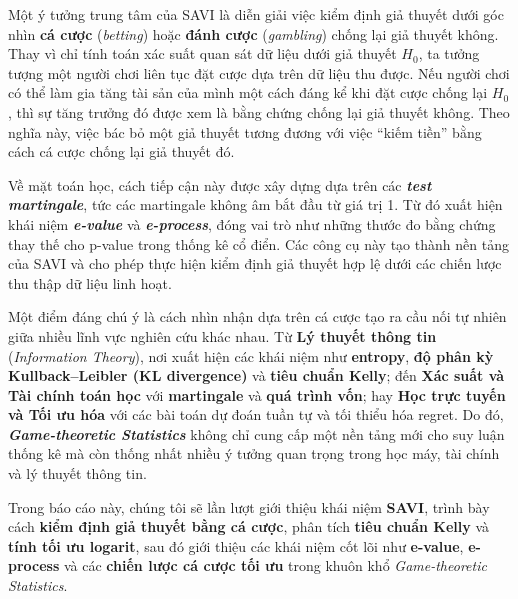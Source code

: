 Một ý tưởng trung tâm của SAVI là diễn giải việc kiểm định giả thuyết dưới góc nhìn \textbf{cá cược} (\textit{betting}) hoặc \textbf{đánh cược} (\textit{gambling}) chống lại giả thuyết không. Thay vì chỉ tính toán xác suất quan sát dữ liệu dưới giả thuyết $H_0$, ta tưởng tượng một người chơi liên tục đặt cược dựa trên dữ liệu thu được. Nếu người chơi có thể làm gia tăng tài sản của mình một cách đáng kể khi đặt cược chống lại $H_0$, thì sự tăng trưởng đó được xem là bằng chứng chống lại giả thuyết không. Theo nghĩa này, việc bác bỏ một giả thuyết tương đương với việc ``kiếm tiền'' bằng cách cá cược chống lại giả thuyết đó.

Về mặt toán học, cách tiếp cận này được xây dựng dựa trên các \textbf{\textit{test martingale}}, tức các martingale không âm bắt đầu từ giá trị 1. Từ đó xuất hiện khái niệm \textbf{\textit{e-value}} và \textbf{\textit{e-process}}, đóng vai trò như những thước đo bằng chứng thay thế cho p-value trong thống kê cổ điển. Các công cụ này tạo thành nền tảng của SAVI và cho phép thực hiện kiểm định giả thuyết hợp lệ dưới các chiến lược thu thập dữ liệu linh hoạt.

Một điểm đáng chú ý là cách nhìn nhận dựa trên cá cược tạo ra cầu nối tự nhiên giữa nhiều lĩnh vực nghiên cứu khác nhau. Từ \textbf{Lý thuyết thông tin} (\textit{Information Theory}), nơi xuất hiện các khái niệm như \textbf{entropy}, \textbf{độ phân kỳ Kullback--Leibler (KL divergence)} và \textbf{tiêu chuẩn Kelly}; đến \textbf{Xác suất và Tài chính toán học} với \textbf{martingale} và \textbf{quá trình vốn}; hay \textbf{Học trực tuyến và Tối ưu hóa} với các bài toán dự đoán tuần tự và tối thiểu hóa regret. Do đó, \textbf{\textit{Game-theoretic Statistics}} không chỉ cung cấp một nền tảng mới cho suy luận thống kê mà còn thống nhất nhiều ý tưởng quan trọng trong học máy, tài chính và lý thuyết thông tin.

Trong báo cáo này, chúng tôi sẽ lần lượt giới thiệu khái niệm \textbf{SAVI}, trình bày cách \textbf{kiểm định giả thuyết bằng cá cược}, phân tích \textbf{tiêu chuẩn Kelly} và \textbf{tính tối ưu logarit}, sau đó giới thiệu các khái niệm cốt lõi như \textbf{e-value}, \textbf{e-process} và các \textbf{chiến lược cá cược tối ưu} trong khuôn khổ \textit{Game-theoretic Statistics}. 